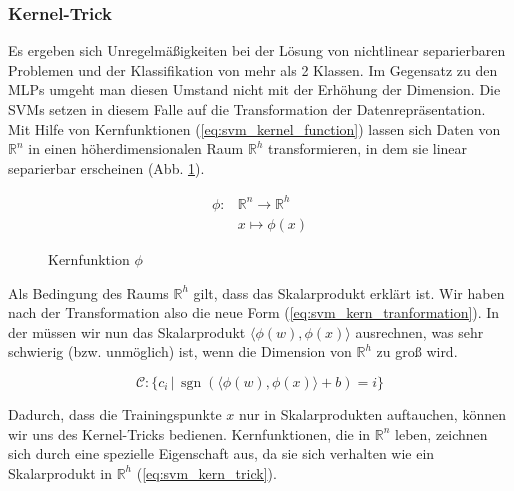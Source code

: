 \subsubsection{Kernel-Trick}
Es ergeben sich Unregelmäßigkeiten bei der Lösung von nichtlinear separierbaren Problemen und der Klassifikation von mehr als 2 Klassen.
Im Gegensatz zu den MLPs umgeht man diesen Umstand nicht mit der Erhöhung der Dimension. 
Die \ac{SVM}s setzen in diesem Falle auf die Transformation der Datenrepräsentation. 
Mit Hilfe von Kernfunktionen (\ref{eq:svm_kernel_function}) lassen sich Daten von $\mathbb{R}^n$ in einen höherdimensionalen Raum $\mathbb{R}^h$ transformieren, in dem sie linear separierbar erscheinen (Abb. \ref{fig:svm_kernel}). 

\begin{equation}
\label{eq:svm_kernel_function}
\begin{split}
    \phi : & \mathbb{R}^n \to \mathbb{R}^h \\
    & x \mapsto \phi(x)
\end{split} 
\end{equation}

\begin{figure}[htbp] \centering
    \caption{Kernfunktion $\phi$}
    \label{fig:svm_kernel}
\end{figure}

Als Bedingung des Raums $\mathbb{R}^h$ gilt, dass das Skalarprodukt erklärt ist. 
Wir haben nach der Transformation also die neue Form (\ref{eq:svm_kern_tranformation}). 
In der müssen wir nun das Skalarprodukt $\langle\phi(w),\phi(x)\rangle$ ausrechnen, was sehr schwierig (bzw. unmöglich) ist, wenn die Dimension von $\mathbb{R}^h$ zu groß wird.

\begin{equation}
\label{eq:svm_kern_tranformation}
    \mathcal{C}: \{ c_i \,|\, \operatorname{sgn}(\langle \phi(w),\phi(x) \rangle + b) = i \}
\end{equation}

Dadurch, dass die Trainingspunkte $x$ nur in Skalarprodukten auftauchen, können wir uns des Kernel-Tricks bedienen.
Kernfunktionen, die in $\mathbb{R}^n$ leben, zeichnen sich durch eine spezielle Eigenschaft aus, da sie sich verhalten wie ein Skalarprodukt in $\mathbb{R}^h$ (\ref{eq:svm_kern_trick}). 

